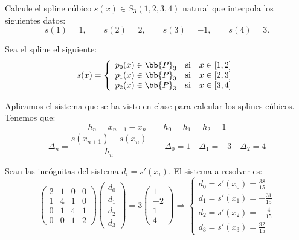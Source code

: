 \begin{ejercicio}
    Calcule el spline cúbico $s(x) \in S_3(1, 2, 3, 4)$ natural que interpola los siguientes datos:
    \begin{equation*}
        s(1) = 1,\qquad s(2) = 2,\qquad s(3) = -1,\qquad s(4) = 3.
    \end{equation*}



    Sea el spline el siguiente:
    \begin{equation*}
        s(x)=\left\{\begin{array}{ccl}
            p_0(x)\in \bb{P}_3 & \text{si} & x\in [1, 2] \\
            p_{1}(x)\in \bb{P}_3 & \text{si} & x\in [2, 3] \\
            p_{2}(x)\in \bb{P}_3 & \text{si} & x\in [3, 4] \\
        \end{array} \right.
    \end{equation*}

    Aplicamos el sistema que se ha visto en clase para calcular los splines cúbicos. Tenemos que:
    \begin{equation*}
        h_n = x_{n+1} - x_n \qquad h_0=h_1 = h_2 = 1
    \end{equation*}
    \begin{equation*}
        \Delta_n = \frac{s(x_{n+1}) - s(x_n)}{h_n} \qquad \Delta_0=1 \quad \Delta_1=-3 \quad \Delta_2=4
    \end{equation*}

    Sean las incógnitas del sistema $d_i = s'(x_i)$. El sistema a resolver es:
    \begin{equation*}
        \left(\begin{array}{cccc}
            2 & 1 & 0 & 0\\
            1 & 4 & 1 & 0\\
            0 & 1 & 4 & 1 \\
            0 & 0 & 1 & 2
        \end{array}\right)
        \left(\begin{array}{ccc}
            d_0 \\ d_1 \\ d_2 \\ d_3
        \end{array}\right) =
        3\left(\begin{array}{ccc}
            1 \\ -2 \\ 1 \\ 4
        \end{array}\right) \Longrightarrow \left\{\begin{array}{l}
            d_0=s'(x_0)=\frac{38}{15} \\ d_1=s'(x_1)=-\frac{31}{15} \\ d_2=s'(x_2) = -\frac{4}{15} \\ d_3=s'(x_3) = \frac{92}{15}
        \end{array}\right.
    \end{equation*}


\end{ejercicio}
